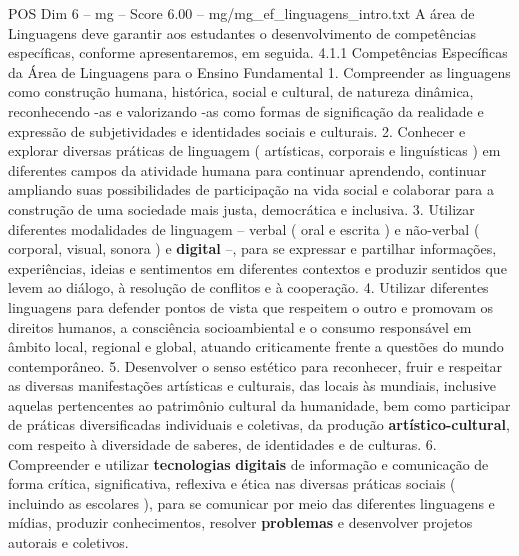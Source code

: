 \begin{textsample}{POS Dim 6 – mg – Score 6.00 – mg/mg\_ef\_linguagens\_intro.txt}
A área de Linguagens deve garantir aos estudantes o desenvolvimento de competências específicas, conforme apresentaremos, em seguida. 4.1.1 Competências Específicas da Área de Linguagens para o Ensino Fundamental 1.
Compreender as linguagens como construção humana, histórica, social e cultural, de natureza dinâmica, reconhecendo -as e valorizando -as como formas de significação da realidade e expressão de subjetividades e identidades sociais e culturais. 2.
Conhecer e explorar diversas práticas de linguagem ( artísticas, corporais e linguísticas ) em diferentes campos da atividade humana para continuar aprendendo, continuar ampliando suas possibilidades de participação na vida social e colaborar para a construção de uma sociedade mais justa, democrática e inclusiva. 3.
Utilizar diferentes modalidades de linguagem – verbal ( oral e escrita ) e não-verbal ( corporal, visual, sonora ) e \textbf{digital} –, para se expressar e partilhar informações, experiências, ideias e sentimentos em diferentes contextos e produzir sentidos que levem ao diálogo, à resolução de conflitos e à cooperação. 4.
Utilizar diferentes linguagens para defender pontos de vista que respeitem o outro e promovam os direitos humanos, a consciência socioambiental e o consumo responsável em âmbito local, regional e global, atuando criticamente frente a questões do mundo contemporâneo. 5.
Desenvolver o senso estético para reconhecer, fruir e respeitar as diversas manifestações artísticas e culturais, das locais às mundiais, inclusive aquelas pertencentes ao patrimônio cultural da humanidade, bem como participar de práticas diversificadas individuais e coletivas, da produção \textbf{artístico-cultural}, com respeito à diversidade de saberes, de identidades e de culturas. 6.
Compreender e utilizar \textbf{tecnologias} \textbf{digitais} de informação e comunicação de forma crítica, significativa, reflexiva e ética nas diversas práticas sociais ( incluindo as escolares ), para se comunicar por meio das diferentes linguagens e mídias, produzir conhecimentos, resolver \textbf{problemas} e desenvolver projetos autorais e coletivos.

\end{textsample}
